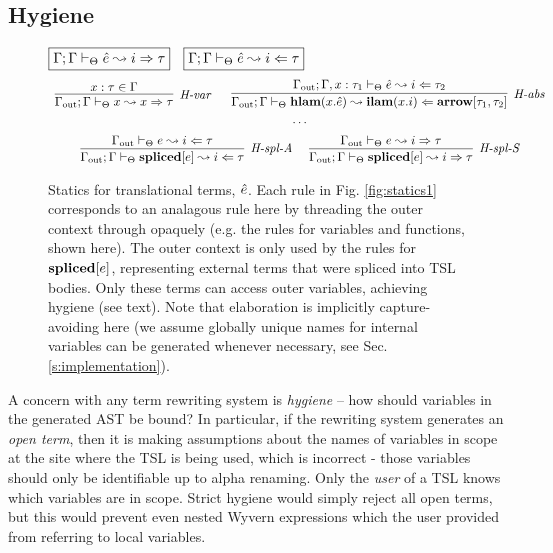 \subsection{Hygiene}
\newcommand{\Gout}{\Gamma_{\text{out}}}
\newcommand{\Gin}{\Gamma}
\begin{figure}[t]
$\fbox{$\Gamma; \Gamma \vdash_\Theta \hat{e} \leadsto i \Rightarrow \tau$}$~
$\fbox{$\Gamma; \Gamma \vdash_\Theta \hat{e} \leadsto i \Leftarrow \tau$}$
\[
\begin{array}{c}
\infer[\textit{H-var}]
	{\Gout; \Gin \vdash_\Theta x \leadsto x \Rightarrow\tau } 
	{x:\tau \in \Gin }
~~~~~
\infer[\textit{H-abs}]
	{\Gout; \Gin \vdash_\Theta  \keyw{hlam}(x . \ih) \leadsto \keyw{ilam}(x.i) \Leftarrow \keyw{arrow}[\tau_1,  \tau_2] } 
	{\Gout; \Gin, x:\tau_1 \vdash_\Theta \ih\leadsto i\Leftarrow \tau_2 }\\[1ex]
\cdots\\[1ex]
\infer[\textit{H-spl-A}]
	{\Gout; \Gin \vdash_\Theta \keyw{spliced}[e] \leadsto i \Leftarrow \tau}
	{\Gout \vdash_\Theta e \leadsto i \Leftarrow \tau}~~~~

\infer[\textit{H-spl-S}]
	{\Gout; \Gin \vdash_\Theta \keyw{spliced}[e] \leadsto i \Rightarrow \tau}
	{\Gout \vdash_\Theta e \leadsto i \Rightarrow \tau}
\end{array}
\]
\caption{Statics for translational terms, $\hat{e}$. Each rule in Fig. \ref{fig:statics1} corresponds to an analagous rule here by threading the outer context through opaquely (e.g. the rules for variables and functions, shown here). The outer context is only used by the rules for $\textbf{spliced}[e]$, representing external terms that were spliced into TSL bodies. Only these terms can access outer variables, achieving hygiene (see text). Note that elaboration is implicitly capture-avoiding here (we assume globally unique names for internal variables can be generated whenever necessary, see Sec. \ref{s:implementation}).}
\label{fig:staticsHat}
\end{figure}

A concern with any term rewriting system is \emph{hygiene} -- how should variables in the generated AST be bound? In particular, if the rewriting system generates an \emph{open term}, then it is making assumptions about the names of variables in scope at the site where the TSL is being used, which is incorrect - those variables should only be identifiable up to alpha renaming. Only the \emph{user} of a TSL knows which variables are in scope. Strict hygiene would simply reject all open terms, but this would prevent even nested Wyvern expressions which the user provided from referring to local variables.

